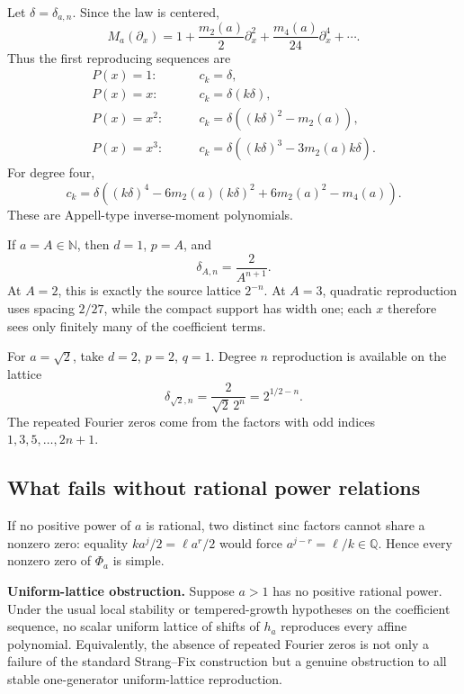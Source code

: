 \documentclass[11pt,oneside]{article}
\numberwithin{equation}{section}
\theoremstyle{definition}
\theoremstyle{remark}
\newcommand{\Q}{\mathbb Q}
\newcommand{\N}{\mathbb N}
\begin{document}
Let $\delta=\delta_{a,n}$.  Since the law is centered,
\[
 M_a(\partial_x)=1+\frac{m_2(a)}{2}\partial_x^2+\frac{m_4(a)}{24}\partial_x^4+\cdots.
\]
Thus the first reproducing sequences are
\begin{align}
 P(x)=1:&\qquad c_k=\delta,\label{p6:eq:reproduce-1}\\
 P(x)=x:&\qquad c_k=\delta(k\delta),\label{p6:eq:reproduce-x}\\
 P(x)=x^2:&\qquad
 c_k=\delta\left((k\delta)^2-m_2(a)\right),\label{p6:eq:reproduce-x2}\\
 P(x)=x^3:&\qquad
 c_k=\delta\left((k\delta)^3-3m_2(a)k\delta\right).
 \label{p6:eq:reproduce-x3}
\end{align}
For degree four,
\begin{equation}\label{p6:eq:reproduce-x4}
 c_k=\delta\left((k\delta)^4-6m_2(a)(k\delta)^2
 +6m_2(a)^2-m_4(a)\right).
\end{equation}
These are Appell-type inverse-moment polynomials.

\begin{example}
If $a=A\in\N$, then $d=1$, $p=A$, and
\begin{equation}\label{p6:eq:integer-lattice}
 \delta_{A,n}=\frac{2}{A^{n+1}}.
\end{equation}
At $A=2$, this is exactly the source lattice $2^{-n}$.  At $A=3$, quadratic
reproduction uses spacing $2/27$, while the compact support has width one; each
$x$ therefore sees only finitely many of the coefficient terms.
\end{example}

\begin{example}
For $a=\sqrt2$, take $d=2$, $p=2$, $q=1$.  Degree $n$ reproduction is available
on the lattice
\[
 \delta_{\sqrt2,n}=\frac{2}{\sqrt2\,2^n}=2^{1/2-n}.
\]
The repeated Fourier zeros come from the factors with odd indices
$1,3,5,\ldots,2n+1$.
\end{example}

\subsection{What fails without rational power relations}

If no positive power of $a$ is rational, two distinct sinc factors cannot share
a nonzero zero: equality
$ka^j/2=\ell a^r/2$ would force $a^{j-r}=\ell/k\in\Q$.  Hence every nonzero
zero of $\Phi_a$ is simple.

\begin{conjbox}
\textbf{Uniform-lattice obstruction.}
Suppose $a>1$ has no positive rational power.  Under the usual local stability
or tempered-growth hypotheses on the coefficient sequence, no scalar uniform
lattice of shifts of $h_a$ reproduces every affine polynomial.  Equivalently,
the absence of repeated Fourier zeros is not only a failure of the standard
Strang--Fix construction but a genuine obstruction to all stable one-generator
uniform-lattice reproduction.
\end{conjbox}
\end{document}
